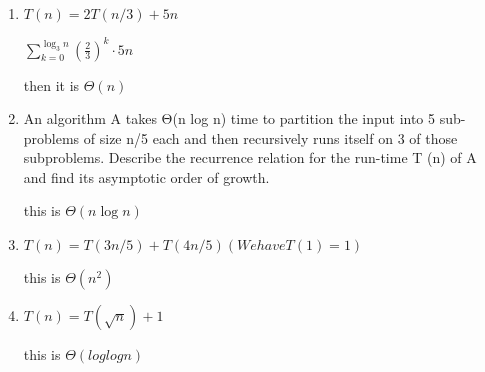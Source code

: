 \documentclass[11pt]{article}
\begin{document}
\begin{enumerate}
    \item $T (n) = 2T (n/3) + 5n$ \par
    \begin{solution}
        $\sum_{k = 0}^{\log_3{n}}(\frac{2}{3})^k\cdot5n  $ \par
        then it is $\varTheta (n)$
    \end{solution}
    \item An algorithm A takes Θ(n log n) time to partition the input into 5 sub-problems of
    size n/5 each and then recursively runs itself on 3 of those subproblems. Describe the
    recurrence relation for the run-time T (n) of A and find its asymptotic order of growth. \par
    \begin{solution}
        this is $\varTheta (n\log{n})$
    \end{solution}
    \item $T (n) = T (3n/5) + T (4n/5) (We have T (1) = 1)$ \par
    \begin{solution}
        this is $\varTheta (n^2)$
    \end{solution}
    \item $T(n)=T(\sqrt{n})+1$ \par
    \begin{solution}
        this is $\varTheta (log{log{n}})$
    \end{solution}
\end{enumerate}
\end{document}
